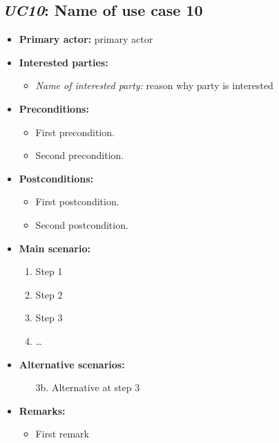 \documentclass[a4paper,10pt]{article}
\begin{document}
\subsection{\emph{UC10}: Name of use case 10}
\begin{itemize}
    \item \textbf{Primary actor:} primary actor
    \item \textbf{Interested parties:} 
        \begin{itemize}
            \item \textit{Name of interested party:} reason why party is interested
        \end{itemize}

    \item \textbf{Preconditions:}
        \begin{itemize}
            \item First precondition.
            \item Second precondition.
        \end{itemize}

    \item \textbf{Postconditions:}
        \begin{itemize}
            \item First postcondition.
            \item Second postcondition.
        \end{itemize}
        
    \item \textbf{Main scenario:} 
    \begin{enumerate}
       \item Step 1
       \item Step 2
       \item Step 3
       \item \ldots
    \end{enumerate}

    \item \textbf{Alternative scenarios:} 
    \begin{enumerate}
        \item [3b.] Alternative at step 3
    \end{enumerate}
    
    \item \textbf{Remarks:}
        \begin{itemize}
            \item First remark
        \end{itemize}
\end{itemize}
\end{document}
